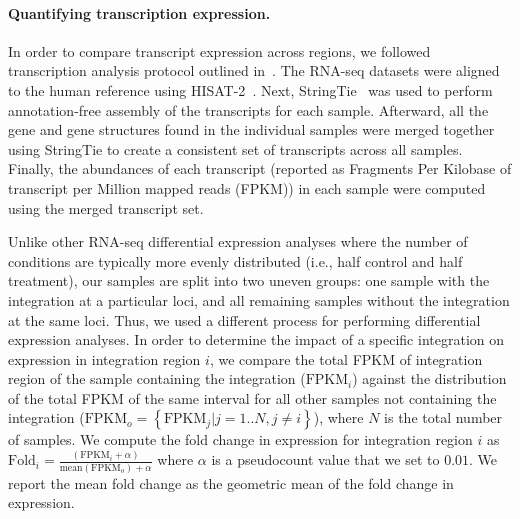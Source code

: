 \documentclass{bmcart}
\begin{document}
\paragraph{\textbf{Quantifying transcription expression.}}
In order to compare transcript expression across regions, we followed transcription analysis protocol outlined in~\cite{Pertea2016}.  The RNA-seq datasets were aligned to the human reference using HISAT-2~\cite{Kim2015}.  Next, StringTie~\cite{Pertea2015} was used to perform annotation-free assembly of the transcripts for each sample.  Afterward, all the gene and gene structures found in the individual samples were merged together using StringTie to create a consistent set of transcripts across all samples.  Finally, the abundances of each transcript (reported as Fragments Per Kilobase of transcript per Million mapped reads (FPKM)) in each sample were computed using the merged transcript set.  

Unlike other RNA-seq differential expression analyses where the number of conditions are typically more evenly distributed (i.e., half control and half treatment), our samples are split into two uneven groups: one sample with the integration at a particular loci, and all remaining samples without the integration at the same loci.  Thus, we used a different process for performing differential expression analyses.  In order to determine the impact of a specific integration on expression in integration region $i$, we compare the total FPKM of integration region of the sample containing the integration ($\mbox{FPKM}_i$) against the distribution of the total FPKM of the same interval for all other samples not containing the integration ($\mbox{FPKM}_{o}=\left\{\mbox{FPKM}_j|j=1..N,j\ne i\right\}$), where $N$ is the total number of samples.  We compute the fold change in expression for integration region $i$ as $\mbox{Fold}_i=\frac{(\mbox{FPKM}_i+\alpha)}{\mbox{mean}(\mbox{FPKM}_o)+\alpha}$ where $\alpha$ is a pseudocount value that we set to $0.01$.  We report the mean fold change as the geometric mean of the fold change in expression.  
\end{document}
